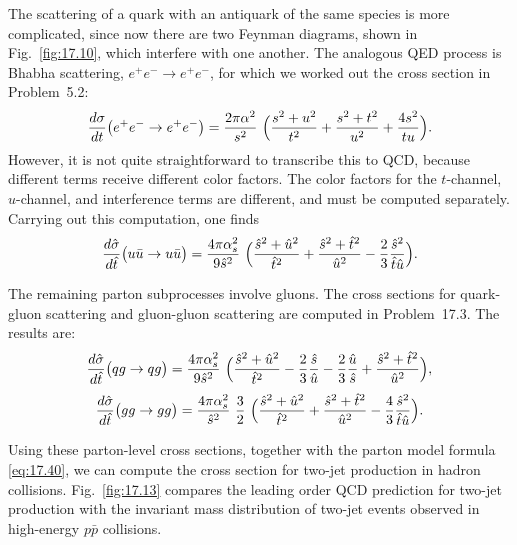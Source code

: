 The scattering of a quark with an antiquark of the same species is more
complicated, since now there are two Feynman diagrams, shown in
Fig.~\ref{fig:17.10}, which interfere with one another.  The analogous QED
process is Bhabha scattering, $e^{+}e^{-}\to e^{+}e^{-}$, for which we worked
out the cross section in Problem~5.2:
\begin{equation}
  \frac{d\sigma}{dt}\bigl( e^{+}e^{-} \to e^{+}e^{-} \bigr)
  = \frac{2\pi\alpha^2}{s^2}\ \Bigl( \frac{s^2 + u^2}{t^2}
    + \frac{s^2 + t^2}{u^2} + \frac{4s^2}{tu} \Bigr) .
  \label{eq:17.66}
\end{equation}
However, it is not quite straightforward to transcribe this to QCD, because
different terms receive different color factors.  The color factors for the
$t$-channel, $u$-channel, and interference terms are different, and must be
computed separately.  Carrying out this computation, one finds
\begin{equation}
  \frac{d\hat{\sigma}}{d\hat{t}}\bigl( u\bar{u} \to u\bar{u} \bigr)
  = \frac{4\pi\alpha_s^2}{9\hat{s}^2}\ \Bigl( \frac{\hat{s}^2 + \hat{u}^2}
    {\hat{t}^2} + \frac{\hat{s}^2 + \hat{t}^2}{\hat{u}^2}
    - \frac{2}{3}\frac{\hat{s}^2}{\hat{t}\hat{u}} \Bigr) .
  \label{eq:17.67}
\end{equation}

The remaining parton subprocesses involve gluons.  The cross sections for
quark-gluon scattering and gluon-gluon scattering are computed in
Problem~17.3.  The results are:
\begin{equation}
  \frac{d\hat{\sigma}}{d\hat{t}}\bigl( qg \to qg \bigr)
  = \frac{4\pi\alpha_s^2}{9\hat{s}^2}\ \Bigl( \frac{\hat{s}^2 + \hat{u}^2}
    {\hat{t}^2} - \frac{2}{3}\frac{\hat{s}}{\hat{u}} - \frac{2}{3}
      \frac{\hat{u}}{\hat{s}} + \frac{\hat{s}^2 + \hat{t}^2}{\hat{u}^2}
    \Bigr) ,
  \label{eq:17.68}
\end{equation}
\begin{equation}
  \frac{d\hat{\sigma}}{d\hat{t}}\bigl( gg \to gg \bigr)
  = \frac{4\pi\alpha_s^2}{\hat{s}^2}\ \frac{3}{2}\ \Bigl( \frac{\hat{s}^2
    + \hat{u}^2}{\hat{t}^2} + \frac{\hat{s}^2 + \hat{t}^2}{\hat{u}^2}
    - \frac{4}{3}\frac{\hat{s}^2}{\hat{t}\hat{u}} \Bigr) .
  \label{eq:17.69}
\end{equation}

Using these parton-level cross sections, together with the parton model
formula \eqref{eq:17.40}, we can compute the cross section for two-jet
production in hadron collisions.  Fig.~\ref{fig:17.13} compares the leading
order QCD prediction for two-jet production with the invariant mass
distribution of two-jet events observed in high-energy $p\bar{p}$ collisions.


